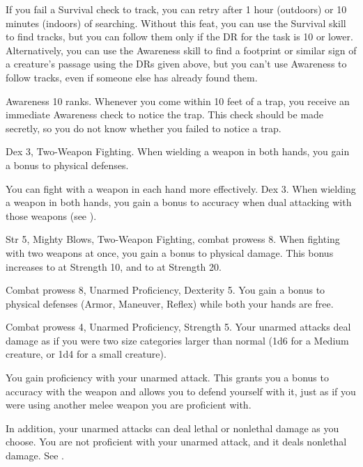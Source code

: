 If you fail a Survival check to track, you can retry after 1 hour (outdoors) or 10 minutes (indoors) of searching.
Without this feat, you can use the Survival skill to find tracks, but you can follow them only if the DR for the task is 10 or lower.
Alternatively, you can use the Awareness skill to find a footprint or similar sign of a creature's passage using the DRs given above, but you can't use Awareness to follow tracks, even if someone else has already found them.

\featpre Awareness 10 ranks.
\featben Whenever you come within 10 feet of a trap, you receive an immediate Awareness check to notice the trap.
This check should be made secretly, so you do not know whether you failed to notice a trap.

\featpres Dex 3, Two-Weapon Fighting.
\featben When wielding a weapon in both hands, you gain a  bonus to physical defenses.

You can fight with a weapon in each hand more effectively.
\featpre Dex 3.
\featben When wielding a weapon in both hands, you gain a  bonus to accuracy when dual attacking with those weapons (see ).

\featpres Str 5, Mighty Blows, Two-Weapon Fighting, combat prowess 8.
\featben When fighting with two weapons at once, you gain a  bonus to physical damage.
This bonus increases to  at Strength 10, and to  at Strength 20.

\featpres Combat prowess 8, Unarmed Proficiency, Dexterity 5.
\featben You gain a  bonus to physical defenses (Armor, Maneuver, Reflex) while both your hands are free.

\featpres Combat prowess 4, Unarmed Proficiency, Strength 5.
\featben Your unarmed attacks deal damage as if you were two size categories larger than normal (1d6 for a Medium creature, or 1d4 for a small creature).

\featben You gain proficiency with your unarmed attack.
This grants you a  bonus to accuracy with the weapon and allows you to defend yourself with it, just as if you were using another melee weapon you are proficient with.

In addition, your unarmed attacks can deal lethal or nonlethal damage as you choose.
 You are not proficient with your unarmed attack, and it deals nonlethal damage. See .

